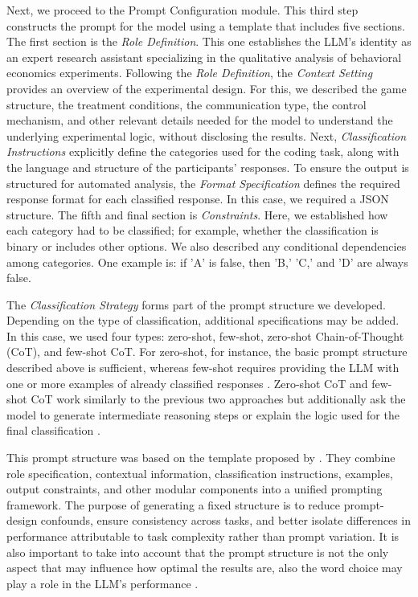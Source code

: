 \documentclass[11pt]{article}
\begin{document}
\begin{sloppypar}
Next, we proceed to the Prompt Configuration module. This third step constructs the prompt for the model using a template that includes five sections. The first section is the \textit{Role Definition}. This one establishes the LLM’s identity as an expert research assistant specializing in the qualitative analysis of behavioral economics experiments. Following the \textit{Role Definition}, the \textit{Context Setting} provides an overview of the experimental design. For this, we described the game structure, the treatment conditions, the communication type, the control mechanism, and other relevant details needed for the model to understand the underlying experimental logic, without disclosing the results. Next, \textit{Classification Instructions} explicitly define the categories used for the coding task, along with the language and structure of the participants’ responses. To ensure the output is structured for automated analysis, the \textit{Format Specification} defines the required response format for each classified response. In this case, we required a JSON structure. The fifth and final section is \textit{Constraints}. Here, we established how each category had to be classified; for example, whether the classification is binary or includes other options. We also described any conditional dependencies among categories. One example is: if 'A' is false, then 'B,' 'C,' and 'D' are always false.

The \textit{Classification Strategy} forms part of the prompt structure we developed. Depending on the type of classification, additional specifications may be added. In this case, we used four types: zero-shot, few-shot, zero-shot Chain-of-Thought (CoT), and few-shot CoT. For zero-shot, for instance, the basic prompt structure described above is sufficient, whereas few-shot requires providing the LLM with one or more examples of already classified responses \citep{brown2020language}. Zero-shot CoT and few-shot CoT work similarly to the previous two approaches but additionally ask the model to generate intermediate reasoning steps or explain the logic used for the final classification \citep{wei2022chain}.

This prompt structure was based on the template proposed by \cite{penczynski2019using}. They combine role specification, contextual information, classification instructions, examples, output constraints, and other modular components into a unified prompting framework. The purpose of generating a fixed structure is to reduce prompt-design confounds, ensure consistency across tasks, and better isolate differences in performance attributable to task complexity rather than prompt variation. It is also important to take into account that the prompt structure is not the only aspect that may influence how optimal  the results are, also the word choice may play a role in the LLM's performance \cite{penczynski2019using}.


\end{sloppypar}
\end{document}
